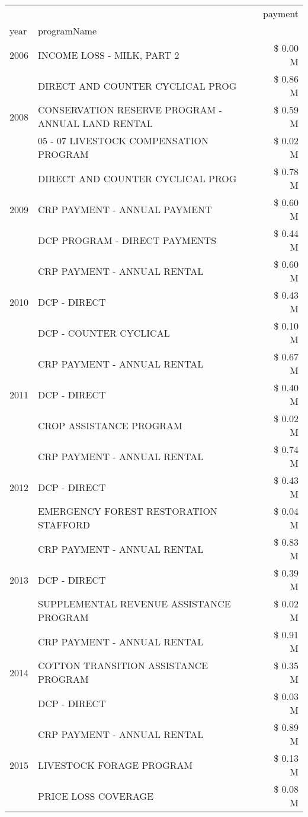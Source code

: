\begin{tabular}{llr}
\toprule
 &  & payment \\
year & programName &  \\
\midrule
2006 & INCOME LOSS - MILK, PART 2 & \$ 0.00 M \\
\cline{1-3}
\multirow[t]{3}{*}{2008} & DIRECT AND COUNTER CYCLICAL PROG & \$ 0.86 M \\
 & CONSERVATION RESERVE PROGRAM - ANNUAL LAND RENTAL & \$ 0.59 M \\
 & 05 - 07 LIVESTOCK COMPENSATION PROGRAM & \$ 0.02 M \\
\cline{1-3}
\multirow[t]{3}{*}{2009} & DIRECT AND COUNTER CYCLICAL PROG & \$ 0.78 M \\
 & CRP PAYMENT - ANNUAL PAYMENT & \$ 0.60 M \\
 & DCP PROGRAM - DIRECT PAYMENTS & \$ 0.44 M \\
\cline{1-3}
\multirow[t]{3}{*}{2010} & CRP PAYMENT - ANNUAL RENTAL & \$ 0.60 M \\
 & DCP - DIRECT & \$ 0.43 M \\
 & DCP - COUNTER CYCLICAL & \$ 0.10 M \\
\cline{1-3}
\multirow[t]{3}{*}{2011} & CRP PAYMENT - ANNUAL RENTAL & \$ 0.67 M \\
 & DCP - DIRECT & \$ 0.40 M \\
 & CROP ASSISTANCE PROGRAM & \$ 0.02 M \\
\cline{1-3}
\multirow[t]{3}{*}{2012} & CRP PAYMENT - ANNUAL RENTAL & \$ 0.74 M \\
 & DCP - DIRECT & \$ 0.43 M \\
 & EMERGENCY FOREST RESTORATION STAFFORD & \$ 0.04 M \\
\cline{1-3}
\multirow[t]{3}{*}{2013} & CRP PAYMENT - ANNUAL RENTAL & \$ 0.83 M \\
 & DCP - DIRECT & \$ 0.39 M \\
 & SUPPLEMENTAL REVENUE ASSISTANCE PROGRAM & \$ 0.02 M \\
\cline{1-3}
\multirow[t]{3}{*}{2014} & CRP PAYMENT - ANNUAL RENTAL & \$ 0.91 M \\
 & COTTON TRANSITION ASSISTANCE PROGRAM & \$ 0.35 M \\
 & DCP - DIRECT & \$ 0.03 M \\
\cline{1-3}
\multirow[t]{3}{*}{2015} & CRP PAYMENT - ANNUAL RENTAL & \$ 0.89 M \\
 & LIVESTOCK FORAGE PROGRAM & \$ 0.13 M \\
 & PRICE LOSS COVERAGE & \$ 0.08 M \\

\end{tabular}
